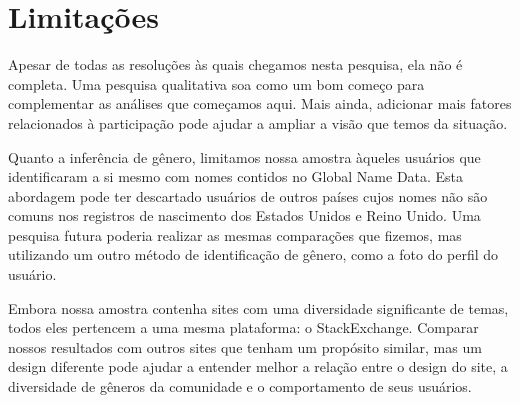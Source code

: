 
\chapter{Limitações}

Apesar de todas as resoluções às quais chegamos nesta pesquisa, ela não é completa. Uma pesquisa qualitativa soa como um bom começo para complementar as análises que começamos aqui. Mais ainda, adicionar mais fatores relacionados à participação pode ajudar a ampliar a visão que temos da situação.


Quanto a inferência de gênero, limitamos nossa amostra àqueles usuários que identificaram a si mesmo com nomes contidos no Global Name Data. Esta abordagem pode ter descartado usuários de outros países cujos nomes não são comuns nos registros de nascimento dos Estados Unidos e Reino Unido. Uma pesquisa futura poderia realizar as mesmas comparações que fizemos, mas utilizando um outro método de identificação de gênero, como a foto do perfil do usuário.


Embora nossa amostra contenha sites com uma diversidade significante de temas, todos eles pertencem a uma mesma plataforma: o StackExchange. Comparar nossos resultados com outros sites que tenham um propósito similar, mas um design diferente pode ajudar a entender melhor a relação entre o design do site, a diversidade de gêneros da comunidade e o comportamento de seus usuários.

